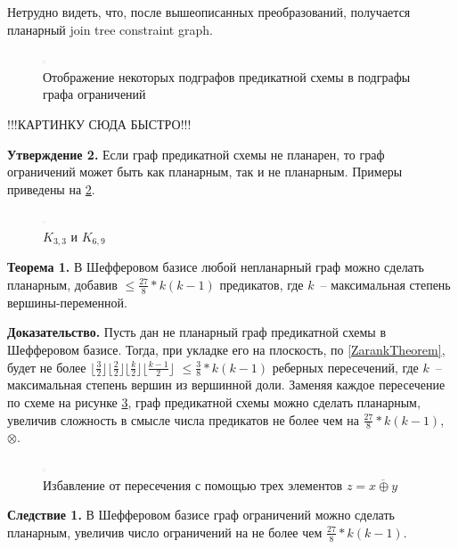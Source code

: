\documentclass[12pt]{article}
\begin{document}
Нетрудно видеть, что, после вышеописанных преобразований, получается планарный join tree constraint graph.

\begin{figure}[htb]
\centering
\includegraphics[width=0.01\textwidth]{constraint_graph.png}
\caption{Отображение некоторых подграфов предикатной схемы в подграфы графа ограничений}
\label{fig:induced_to_constraint}
\end{figure}
!!!КАРТИНКУ СЮДА БЫСТРО!!!

\textbf{Утверждение 2.} Если граф предикатной схемы не планарен, то граф ограничений может быть как планарным, 
так и не планарным.
Примеры приведены на \ref{fig:planar_non_planar}. 

\begin{figure}[htb]
\centering
\includegraphics[width=0.01\textwidth]{constraint_graph.png}
\caption{$K_{3,3}$ и $K_{6,9}$}
\label{fig:planar_non_planar}
\end{figure}

\textbf{Теорема 1.} В Шефферовом базисе любой непланарный граф можно сделать планарным, 
добавив $\leq \frac{27}{8}*k(k-1)$ предикатов, где $k$~-- максимальная степень вершины-переменной.

\textbf{Доказательство.} Пусть дан не планарный граф предикатной схемы в Шефферовом базисе. 
Тогда, при укладке его на плоскость, по \ref{ZarankTheorem}, будет не более 
$\lfloor \frac{3}{2} \rfloor \lfloor \frac{2}{2} \rfloor \lfloor \frac{k}{2} \rfloor \lfloor \frac{k-1}{2} \rfloor$
$\leq \frac{3}{8}*k(k-1)$ реберных пересечений, где $k$~-- максимальная степень вершин из вершинной доли.
Заменяя каждое пересечение по схеме на рисунке \ref{fig:make_planar},
граф предикатной схемы можно сделать планарным,
увеличив сложность в смысле числа предикатов не более чем на $\frac{27}{8}*k(k-1)$, $\otimes$.
\begin{figure}[htb]
\centering
\includegraphics[width=0.01\textwidth]{constraint_graph.png}
\caption{Избавление от пересечения с помощью трех элементов $z=\overline{x \oplus y}$}
\label{fig:make_planar}
\end{figure}

\textbf{Следствие 1.} В Шефферовом базисе граф ограничений можно сделать планарным, увеличив число ограничений 
на не более чем $\frac{27}{8}*k(k-1)$.
\end{document}
